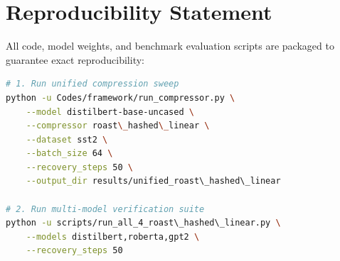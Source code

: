 \section{Reproducibility Statement}
All code, model weights, and benchmark evaluation scripts are packaged to guarantee exact reproducibility:
\begin{lstlisting}[language=bash]
# 1. Run unified compression sweep
python -u Codes/framework/run_compressor.py \
    --model distilbert-base-uncased \
    --compressor roast\_hashed\_linear \
    --dataset sst2 \
    --batch_size 64 \
    --recovery_steps 50 \
    --output_dir results/unified_roast\_hashed\_linear

# 2. Run multi-model verification suite
python -u scripts/run_all_4_roast\_hashed\_linear.py \
    --models distilbert,roberta,gpt2 \
    --recovery_steps 50
\end{lstlisting}
